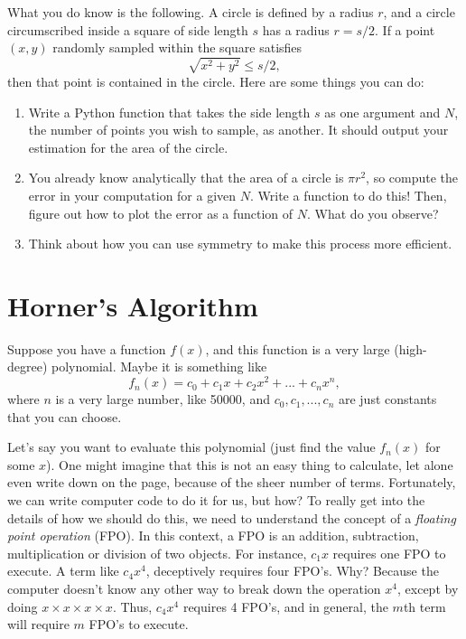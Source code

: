 \documentclass[10pt, letterpaper, twoside]{article}
\begin{document}
What you do know is the following. A circle is defined by a radius $r$, and a 
circle circumscribed inside a square of side length $s$ has a radius
$r = s/2$. If a point $(x, y)$ randomly sampled within the square satisfies
$$ \sqrt{x^2 + y^2} \leq s/2,$$
then that point is contained in the circle. Here are some things you can do:
\begin{enumerate}
	\item Write a Python function that takes the side length $s$ as one 
	argument and $N$, the number of points you wish to sample, as another. It 
	should output your estimation for the area of the circle.
	\item You already know analytically that the area of a circle 
	is $\pi r^2$, so compute the error in your computation for a given $N$.
	Write a function to do this! Then, figure out how to plot the error as a function of $N$. What do you observe?
	\item Think about how you can use symmetry to make this process more 
	efficient.
\end{enumerate}

\section{Horner's Algorithm}
Suppose you have a function $f(x)$, and this function is a very large
(high-degree) polynomial. Maybe it is something like
$$f_n(x) = c_0 + c_1x + c_2 x^2 + ... + c_{n}x^n,$$
where $n$ is a very large number, like 50000, and $c_0, c_1, ..., c_n$ are just
constants that you can choose.

Let's say you want to evaluate this polynomial (just find the value $f_n(x)$
for some $x$). One might imagine that this is not an easy thing
to calculate, let alone even write down on the page, because of the sheer
number of terms. Fortunately, we can write computer code to do it for us, but
how? To really get into the details of how we should do this, we need to
understand the concept of a \emph{floating point operation} (FPO). In this
context, a FPO is an addition, subtraction, multiplication or division of two
objects. For instance, $c_1x$ requires one FPO to execute. A term like
$c_4x^4$, deceptively requires four FPO's. Why? Because the computer doesn't
know any other way to break down the operation $x^4$, except by doing
$ x \times x \times x \times x$. Thus, $c_4x^4$ requires 4 FPO's, and in
general, the $m$th term will require $m$ FPO's to execute.\\
\end{document}

